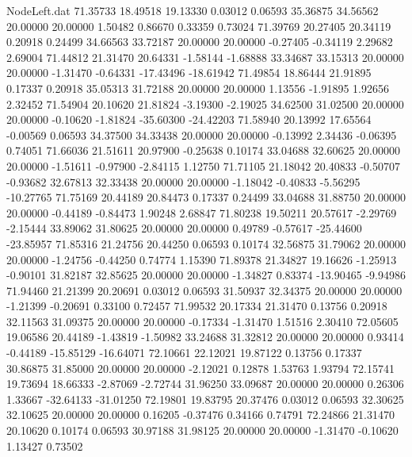 \begin{filecontents}{NodeLeft.dat}
  71.35733   18.49518   19.13330     0.03012    0.06593   35.36875   34.56562   20.00000   20.00000    1.50482    0.86670    0.33359    0.73024
  71.39769   20.27405   20.34119     0.20918    0.24499   34.66563   33.72187   20.00000   20.00000   -0.27405   -0.34119    2.29682    2.69004
  71.44812   21.31470   20.64331    -1.58144   -1.68888   33.34687   33.15313   20.00000   20.00000   -1.31470   -0.64331  -17.43496  -18.61942
  71.49854   18.86444   21.91895     0.17337    0.20918   35.05313   31.72188   20.00000   20.00000    1.13556   -1.91895    1.92656    2.32452
  71.54904   20.10620   21.81824    -3.19300   -2.19025   34.62500   31.02500   20.00000   20.00000   -0.10620   -1.81824  -35.60300  -24.42203
  71.58940   20.13992   17.65564    -0.00569    0.06593   34.37500   34.33438   20.00000   20.00000   -0.13992    2.34436   -0.06395    0.74051
  71.66036   21.51611   20.97900    -0.25638    0.10174   33.04688   32.60625   20.00000   20.00000   -1.51611   -0.97900   -2.84115    1.12750
  71.71105   21.18042   20.40833    -0.50707   -0.93682   32.67813   32.33438   20.00000   20.00000   -1.18042   -0.40833   -5.56295  -10.27765
  71.75169   20.44189   20.84473     0.17337    0.24499   33.04688   31.88750   20.00000   20.00000   -0.44189   -0.84473    1.90248    2.68847
  71.80238   19.50211   20.57617    -2.29769   -2.15444   33.89062   31.80625   20.00000   20.00000    0.49789   -0.57617  -25.44600  -23.85957
  71.85316   21.24756   20.44250     0.06593    0.10174   32.56875   31.79062   20.00000   20.00000   -1.24756   -0.44250    0.74774    1.15390
  71.89378   21.34827   19.16626    -1.25913   -0.90101   31.82187   32.85625   20.00000   20.00000   -1.34827    0.83374  -13.90465   -9.94986
  71.94460   21.21399   20.20691     0.03012    0.06593   31.50937   32.34375   20.00000   20.00000   -1.21399   -0.20691    0.33100    0.72457
  71.99532   20.17334   21.31470     0.13756    0.20918   32.11563   31.09375   20.00000   20.00000   -0.17334   -1.31470    1.51516    2.30410
  72.05605   19.06586   20.44189    -1.43819   -1.50982   33.24688   31.32812   20.00000   20.00000    0.93414   -0.44189  -15.85129  -16.64071
  72.10661   22.12021   19.87122     0.13756    0.17337   30.86875   31.85000   20.00000   20.00000   -2.12021    0.12878    1.53763    1.93794
  72.15741   19.73694   18.66333    -2.87069   -2.72744   31.96250   33.09687   20.00000   20.00000    0.26306    1.33667  -32.64133  -31.01250
  72.19801   19.83795   20.37476     0.03012    0.06593   32.30625   32.10625   20.00000   20.00000    0.16205   -0.37476    0.34166    0.74791
  72.24866   21.31470   20.10620     0.10174    0.06593   30.97188   31.98125   20.00000   20.00000   -1.31470   -0.10620    1.13427    0.73502

\end{filecontents}
